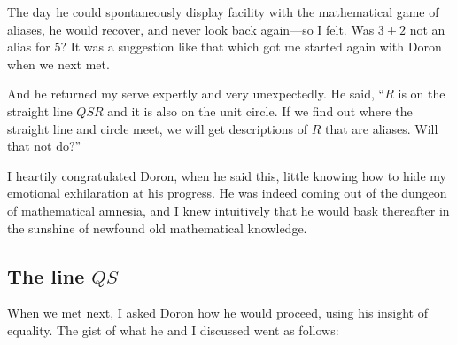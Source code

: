 \documentclass[
  a4paper,
]{article}
\begin{document}
The day he could spontaneously display facility with the mathematical
game of aliases, he would recover, and never look back again---so I
felt. Was \(3 + 2\) not an alias for \(5\)? It was a suggestion like
that which got me started again with Doron when we next met.

And he returned my serve expertly and very unexpectedly. He said,
``\(R\) is on the straight line \(QSR\) and it is also on the unit
circle. If we find out where the straight line and circle meet, we will
get descriptions of \(R\) that are aliases. Will that not do?''

I heartily congratulated Doron, when he said this, little knowing how to
hide my emotional exhilaration at his progress. He was indeed coming out
of the dungeon of mathematical amnesia, and I knew intuitively that he
would bask thereafter in the sunshine of newfound old mathematical
knowledge.

\subsection{\texorpdfstring{The line
\(QS\)}{The line QS}}\label{the-line-qs}

When we met next, I asked Doron how he would proceed, using his insight
of equality. The gist of what he and I discussed went as follows:
\end{document}
